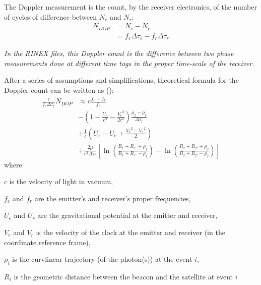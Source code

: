 The Doppler measurement is the count, by the receiver electronics, of the number 
of cycles of difference between \(N_e\) and \(N_r\):
\begin{equation}
    \begin{split}
    N_{DOP} & = N_e - N_r\\
            & = f_e \Delta\tau_e - f_r \Delta\tau_r
    \end{split}
\end{equation}

\emph{In the RINEX files, this Doppler count is the difference between two phase measurements 
done at different time tags in the proper time-scale of the receiver.}

After a series of assumptions and simplifications, theoretical formula for the 
Doppler count can be written as (\cite{Lemoine2016}):
\begin{equation}
    \begin{split}
        \frac{c}{f_e \Delta\tau_r} N_{DOP} & \approx c \frac{f_e - f_r}{f_e} \\
        & - (1 - \frac{U_e}{c^2} - \frac{{V_e}^2}{2 c^2}) \frac{\rho_2 - \rho_1}{\Delta\tau_r}\\
        & + \frac{1}{c} (U_r - U_e + \frac{{V_r}^2 - {V_e}^2}{2}) \\
        & + \frac{2 \mu}{c^2 \Delta\tau_r} [\ln{(\frac{R_1 + R_{1'} + \rho_1}{R_1 + R_{1'} - \rho_1})} - \ln{(\frac{R_2 + R_{2'} + \rho_2}{R_2 + R_{2'} - \rho_2})}]
    \end{split}
\end{equation}
where
\begin{description}
  \item $c$ is the velocity of light in vacuum,
  \item $f_e$ and $f_r$ are the emitter's and receiver's proper frequencies,
  \item $U_e$ and $U_r$ are the gravitational potential at the emitter and receiver,
  \item $V_e$ and $V_r$ is the velocity of the clock at the emitter and receiver 
    (in the coordinate reference frame),
  \item $\rho _i$ is the curvlinear trajectory (of the photon(s)) at the event $i$,
  \item $R_i$ is the geometric distance between the beacon and the satellite at event $i$
\end{description}


